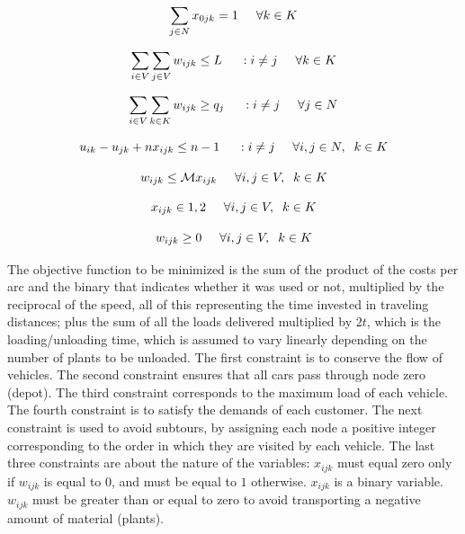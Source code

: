 \documentclass{amsart}
\begin{document}
        \[\sum_{j \in N} x_{0jk} = 1 \hspace{0.5cm} \forall k \in K\]

        \[\sum_{i \in V} \sum_{j \in V} w_{ijk} \leq L \hspace{0.5cm} : i \neq j \hspace{0.5cm} \forall k \in K\]

        \[\sum_{i \in V} \sum_{k \in K} w_{ijk} \geq q_j \hspace{0.5cm} : i \neq j \hspace{0.5cm} \forall j \in N\]

        \[u_{ik} - u_{jk} + n x_{ijk} \leq n - 1 \hspace{0.5cm} : i \neq j \hspace{0.5cm} \forall i,j \in N, \hspace{0.2cm} k \in K\]

        \[w_{ijk} \leq \mathcal{M} x_{ijk} \hspace{0.5cm} \forall i,j \in V, \hspace{0.2cm} k \in K\]

        \[x_{ijk} \in {1, 2} \hspace{0.5cm} \forall i,j \in V, \hspace{0.2cm} k \in K\]
        
        \[w_{ijk} \geq 0 \hspace{0.5cm} \forall i,j \in V, \hspace{0.2cm} k \in K\]

        The objective function to be minimized is the sum of the product of the costs per arc and the binary that indicates whether it was used or not, multiplied by the reciprocal of the speed, all of this representing the time invested in traveling distances; plus the sum of all the loads delivered multiplied by $2t$, which is the loading/unloading time, which is assumed to vary linearly depending on the number of plants to be unloaded. The first constraint is to conserve the flow of vehicles. The second constraint ensures that all cars pass through node zero (depot). The third constraint corresponds to the maximum load of each vehicle. The fourth constraint is to satisfy the demands of each customer. The next constraint is used to avoid subtours, by assigning each node a positive integer corresponding to the order in which they are visited by each vehicle. The last three constraints are about the nature of the variables: $x_{ijk}$ must equal zero only if $w_{ijk}$ is equal to $0$, and must be equal to $1$ otherwise. $x_{ijk}$ is a binary variable. $w_{ijk}$ must be greater than or equal to zero to avoid transporting a negative amount of material (plants).
\end{document}
